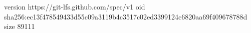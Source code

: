 version https://git-lfs.github.com/spec/v1
oid sha256:ec13f478549433d55c09a3119b4c3517c02ed3399124c6820aa69f409678788d
size 89111
